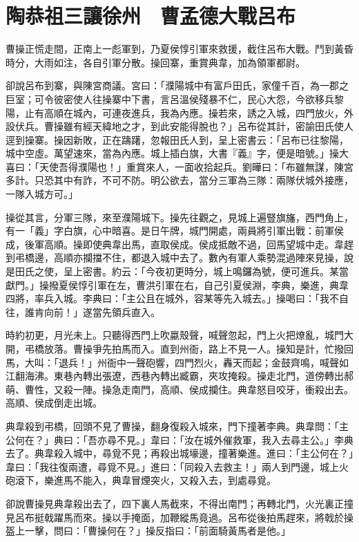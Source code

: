 
\chapter{陶恭祖三讓徐州　曹孟德大戰呂布}

曹操正慌走間，正南上一彪軍到，乃夏侯惇引軍來救援，截住呂布大戰。鬥到黃昏時分，大雨如注，各自引軍分散。操回寨，重賞典韋，加為領軍都尉。

卻說呂布到寨，與陳宮商議。宮曰：「濮陽城中有富戶田氏，家僮千百，為一郡之巨室；可令彼密使人往操寨中下書，言呂溫侯殘暴不仁，民心大怨，今欲移兵黎陽，止有高順在城內，可連夜進兵，我為內應。操若來，誘之入城，四門放火，外設伏兵。曹操雖有經天緯地之才，到此安能得脫也？」呂布從其計，密諭田氏使人逕到操寨。操因新敗，正在躊躇，忽報田氏人到，呈上密書云：「呂布已往黎陽，城中空虛。萬望速來，當為內應。城上插白旗，大書『義』字，便是暗號。」操大喜曰：「天使吾得濮陽也！」重賞來人，一面收拾起兵。劉曄曰：「布雖無謀，陳宮多計。只恐其中有詐，不可不防。明公欲去，當分三軍為三隊：兩隊伏城外接應，一隊入城方可。」

操從其言，分軍三隊，來至濮陽城下。操先往觀之，見城上遍豎旗旛，西門角上，有一「義」字白旗，心中暗喜。是日午牌，城門開處，兩員將引軍出戰：前軍侯成，後軍高順。操即使典韋出馬，直取侯成。侯成抵敵不過，回馬望城中走。韋趕到弔橋邊，高順亦攔擋不住，都退入城中去了。數內有軍人乘勢混過陣來見操，說是田氏之使，呈上密書。約云：「今夜初更時分，城上鳴鑼為號，便可進兵。某當獻門。」操撥夏侯惇引軍在左，曹洪引軍在右，自己引夏侯淵，李典，樂進，典韋四將，率兵入城。李典曰：「主公且在城外，容某等先入城去。」操喝曰：「我不自往，誰肯向前！」遂當先領兵直入。

時約初更，月光未上。只聽得西門上吹蠃殼聲，喊聲忽起，門上火把燎亂，城門大開，弔橋放落。曹操爭先拍馬而入。直到州衙，路上不見一人。操知是計，忙撥回馬，大叫：「退兵！」州衙中一聲砲響，四門烈火，轟天而起；金鼓齊鳴，喊聲如江翻海沸。東巷內轉出張遼，西巷內轉出臧霸，夾攻掩殺。操走北門，道傍轉出郝萌、曹性，又殺一陣。操急走南門，高順、侯成攔住。典韋怒目咬牙，衝殺出去。高順、侯成倒走出城。

典韋殺到弔橋，回頭不見了曹操，翻身復殺入城來，門下撞著李典。典韋問：「主公何在？」典曰：「吾亦尋不見。」韋曰：「汝在城外催救軍，我入去尋主公。」李典去了。典韋殺入城中，尋覓不見；再殺出城壕邊，撞著樂進。進曰：「主公何在？」韋曰：「我往復兩遭，尋覓不見。」進曰：「同殺入去救主！」兩人到門邊，城上火砲滾下，樂進馬不能入，典韋冒煙突火，又殺入去，到處尋覓。

卻說曹操見典韋殺出去了，四下裏人馬截來，不得出南門；再轉北門，火光裏正撞見呂布挺戟躍馬而來。操以手掩面，加鞭縱馬竟過。呂布從後拍馬趕來，將戟於操盔上一擊，問曰：「曹操何在？」操反指曰：「前面騎黃馬者是他。」

